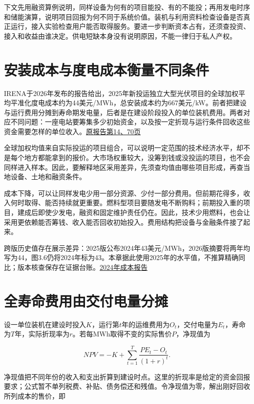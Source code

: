\documentclass[UTF8,fontset=windows,12pt,a4paper,oneside,openany]{ctexbook}
\begin{document}
下文先用融资算例说明，同样设备为何有的项目能投、有的不能投；再用发电时序和储能演算，说明项目回报为何不同于系统价值。装机与利用资料检查设备是否真正运行，接入实验检查用户能否取得服务。要进一步判断资本占有，还须查投资、接入和收益由谁决定。供电短缺本身没有说明原因，不能一律归于私人产权。

\section{安装成本与度电成本衡量不同条件}

IRENA于2026年发布的报告给出，2025年新投运独立大型光伏项目的全球加权平均平准化度电成本约为44美元/MWh，总安装成本约为667美元/kW。前者把建设与运行费用分摊到寿命期发电量，后者是在建设阶段投入的单位装机费用。两者对应不同问题：一座电站要筹集多少初始资金，以及按一定折现与运行条件回收这些资金需要怎样的单位收入。\href{https://www.irena.org/-/media/Files/IRENA/Agency/Publication/2026/Jul/IRENA_TEC_RPGC_in_2025_2026.pdf}{原报告第14、70页}

全球加权均值来自实际投运的项目组合，可以说明一定范围的技术经济水平，却不是每个地方都能拿到的报价。大市场权重较大，没筹到钱或没投运的项目，也不会同样进入样本。因此，要解释地区采用差异，先须查均值由哪些项目形成，再查当地设备、土地和融资条件。

成本下降，可以让同样发电少用一部分资源、少付一部分费用。但前期花得多，收入何时取得、能否持续就更重要。燃料型项目要随发电不断购料；前期投入重的项目，建成后即使少发电，融资和固定维护责任仍在。因此，技术少用燃料，也会让采用更依赖能否筹钱、收入能否回收初始投入。费用结构把设备与金融条件接了起来。

跨版历史值存在展示差异：2025版公布2024年43美元/MWh，2026版摘要将两年均写为44，图3.6仍将2024年标为43。本章据此使用2025年的水平值，不推算精确同比；版本核查保存在证据台账。\href{https://www.irena.org/Digital-Report/Renewable-Power-Generation-Costs-in-2024}{2024年成本报告}



\section{全寿命费用由交付电量分摊}

设一单位装机在建设时投入\(K\)，运行第\(t\)年的运维费用为\(O_t\)，交付电量为\(E_t\)，寿命为\(T\)年，实际折现率为\(r\)。若每MWh取得不变的实际售价\(P\)，净现值为

\[
NPV=-K+\sum_{t=1}^{T}\frac{PE_t-O_t}{(1+r)^t}.
\tag{9-1}
\]

净现值把不同年份的收入和支出折算到建设时点。这里的折现率是给定的资金回报要求；公式暂不单列税费、补贴、债务偿还和残值。令净现值为零，解出刚好回收所列成本的售价，即
\end{document}
